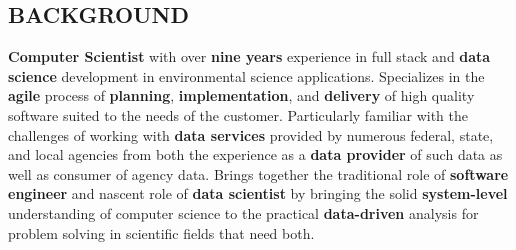 \documentclass[line,margin]{res}
\begin{document}
\address{104 14th Street, Prairie du Sac, WI 53578}
\address{email: jordan@jordanwalker.us | phone: 608.370.1908}
 
\begin{resume}
 
\section{BACKGROUND}
	\textbf{Computer Scientist} with over \textbf{nine years} experience in full stack and \textbf{data science} development in environmental science applications.
	Specializes in the \textbf{agile} process of \textbf{planning}, \textbf{implementation}, and \textbf{delivery} of high quality software suited to the needs of the customer.
	Particularly familiar with the challenges of working with \textbf{data services} provided by numerous federal, state, and local agencies from both the experience as a \textbf{data provider} of such data as well as consumer of agency data.
	Brings together the traditional role of \textbf{software engineer} and nascent role of \textbf{data scientist} by bringing the solid \textbf{system-level} understanding of computer science to the practical \textbf{data-driven} analysis for problem solving in scientific fields that need both.



\end{resume}
\end{document}
